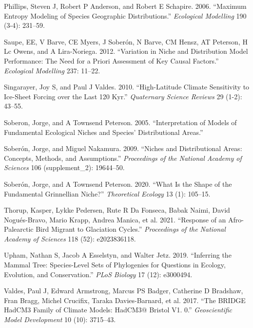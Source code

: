 \documentclass[
]{article}
\newlength{\cslhangindent}
\newlength{\cslentryspacingunit} %
\newenvironment{CSLReferences}[2] %
 {%
  \setlength{\parindent}{0pt}
  \ifodd #1
  \let\oldpar\par
  \def\par{\hangindent=\cslhangindent\oldpar}
  \fi
  \setlength{\parskip}{#2\cslentryspacingunit}
 }%
 {}
\begin{document}
\begin{CSLReferences}{1}{0}
\leavevmode{}%
Phillips, Steven J, Robert P Anderson, and Robert E Schapire. 2006.
{``Maximum Entropy Modeling of Species Geographic Distributions.''}
\emph{Ecological Modelling} 190 (3-4): 231--59.

\leavevmode{}%
Saupe, EE, V Barve, CE Myers, J Soberón, N Barve, CM Hensz, AT Peterson,
H Lc Owens, and A Lira-Noriega. 2012. {``Variation in Niche and
Distribution Model Performance: The Need for a Priori Assessment of Key
Causal Factors.''} \emph{Ecological Modelling} 237: 11--22.

\leavevmode{}%
Singarayer, Joy S, and Paul J Valdes. 2010. {``High-Latitude Climate
Sensitivity to Ice-Sheet Forcing over the Last 120 Kyr.''}
\emph{Quaternary Science Reviews} 29 (1-2): 43--55.

\leavevmode{}%
Soberon, Jorge, and A Townsend Peterson. 2005. {``Interpretation of
Models of Fundamental Ecological Niches and Species' Distributional
Areas.''}

\leavevmode{}%
Soberón, Jorge, and Miguel Nakamura. 2009. {``Niches and Distributional
Areas: Concepts, Methods, and Assumptions.''} \emph{Proceedings of the
National Academy of Sciences} 106 (supplement\_2): 19644--50.

\leavevmode{}%
Soberón, Jorge, and A Townsend Peterson. 2020. {``What Is the Shape of
the Fundamental Grinnellian Niche?''} \emph{Theoretical Ecology} 13 (1):
105--15.

\leavevmode{}%
Thorup, Kasper, Lykke Pedersen, Rute R Da Fonseca, Babak Naimi, David
Nogués-Bravo, Mario Krapp, Andrea Manica, et al. 2021. {``Response of an
Afro-Palearctic Bird Migrant to Glaciation Cycles.''} \emph{Proceedings
of the National Academy of Sciences} 118 (52): e2023836118.

\leavevmode{}%
Upham, Nathan S, Jacob A Esselstyn, and Walter Jetz. 2019. {``Inferring
the Mammal Tree: Species-Level Sets of Phylogenies for Questions in
Ecology, Evolution, and Conservation.''} \emph{PLoS Biology} 17 (12):
e3000494.

\leavevmode{}%
Valdes, Paul J, Edward Armstrong, Marcus PS Badger, Catherine D
Bradshaw, Fran Bragg, Michel Crucifix, Taraka Davies-Barnard, et al.
2017. {``The BRIDGE HadCM3 Family of Climate Models: HadCM3@ Bristol V1.
0.''} \emph{Geoscientific Model Development} 10 (10): 3715--43.


\end{CSLReferences}
\end{document}
